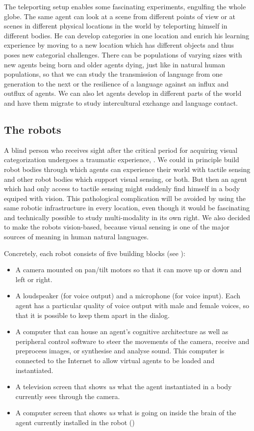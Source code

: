 The teleporting setup enables some fascinating 
experiments, engulfing the 
whole globe. The same agent can look at a scene from
different points of view or at scenes in different
physical locations in the world by teleporting himself in different 
bodies. He can develop categories in one location
and enrich his learning experience by moving to a new 
location which has different objects and thus poses new 
categorial challenges.
There can be populations of varying sizes with new 
agents being born and older agents dying, just like in 
natural human populations, so that we can study the 
transmission of language from one generation to the next
or the resilience of a language against an influx and 
outflux of agents. We can also let agents develop in
different parts of the world and have them migrate to
study intercultural exchange and language contact. 

\subsection{The robots}

A blind person who receives sight after the critical 
period for acquiring visual categorization undergoes a 
traumatic experience, \cite{Zeki:1993}. 
We could in principle build robot bodies
through which agents can experience their world with tactile
sensing and other robot bodies which support visual sensing, or both. 
But then an agent which had only access to tactile
sensing might suddenly find himself in a body equiped with 
vision. This pathological complication will 
be avoided by using the same robotic infrastructure
in every location, even though it would be fascinating and 
technically possible to study multi-modality in its 
own right. 
We also decided to make the robots vision-based, because visual 
sensing is one of the major sources of meaning in
human natural languages. 

Concretely, each robot consists of five building blocks (see ):
\begin{itemize}
\item A camera mounted on pan/tilt motors so that it can move 
up or down and left or right. 
\item A loudspeaker (for voice output) and a microphone (for 
voice input). Each agent has a particular quality of voice
output with male and female voices, so that it is possible 
to keep them apart in the dialog. 
\item A computer that can house an agent's 
cognitive architecture as well as peripheral 
control software to steer the movements of the camera, 
receive and preprocess images, or synthesise and analyse 
sound. This computer is connected 
to the Internet to allow virtual agents to be loaded and instantiated. 
\item A television screen that shows {\it us} what the agent
instantiated in a body currently sees through the camera. 
\item A computer screen that shows {\it us} what is going on inside
the brain of the agent currently installed in the robot ()
\end{itemize}

